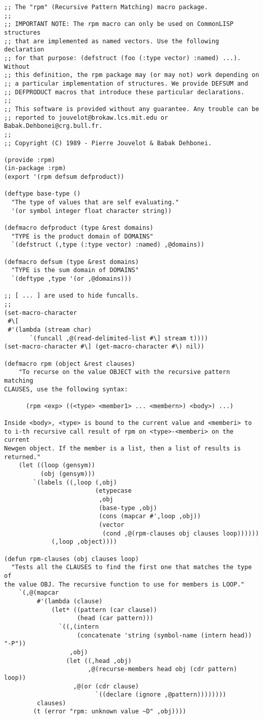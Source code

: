 \documentclass[a4paper,11pt]{article}
\begin{document}
{\small
\begin{verbatim}
;; The "rpm" (Recursive Pattern Matching) macro package.
;;
;; IMPORTANT NOTE: The rpm macro can only be used on CommonLISP structures
;; that are implemented as named vectors. Use the following declaration
;; for that purpose: (defstruct (foo (:type vector) :named) ...). Without
;; this definition, the rpm package may (or may not) work depending on
;; a particular implementation of structures. We provide DEFSUM and
;; DEFPRODUCT macros that introduce these particular declarations.
;; 
;; This software is provided without any guarantee. Any trouble can be
;; reported to jouvelot@brokaw.lcs.mit.edu or Babak.Dehbonei@crg.bull.fr.
;;
;; Copyright (C) 1989 - Pierre Jouvelot & Babak Dehbonei.

(provide :rpm)
(in-package :rpm)
(export '(rpm defsum defproduct))

(deftype base-type ()
  "The type of values that are self evaluating."
  '(or symbol integer float character string))

(defmacro defproduct (type &rest domains)
  "TYPE is the product domain of DOMAINS"
  `(defstruct (,type (:type vector) :named) ,@domains))

(defmacro defsum (type &rest domains)
  "TYPE is the sum domain of DOMAINS"
  `(deftype ,type '(or ,@domains)))

;; [ ... ] are used to hide funcalls.
;;
(set-macro-character
 #\[
 #'(lambda (stream char)
       `(funcall ,@(read-delimited-list #\] stream t))))
(set-macro-character #\] (get-macro-character #\) nil))

(defmacro rpm (object &rest clauses)
    "To recurse on the value OBJECT with the recursive pattern matching
CLAUSES, use the following syntax:

      (rpm <exp> ((<type> <member1> ... <membern>) <body>) ...)

Inside <body>, <type> is bound to the current value and <memberi> to
to i-th recursive call result of rpm on <type>-<memberi> on the current
Newgen object. If the member is a list, then a list of results is
returned."
    (let ((loop (gensym))
          (obj (gensym)))
        `(labels ((,loop (,obj)
                         (etypecase
                          ,obj
                          (base-type ,obj)
                          (cons (mapcar #',loop ,obj))
                          (vector
                           (cond ,@(rpm-clauses obj clauses loop))))))
             (,loop ,object))))

(defun rpm-clauses (obj clauses loop)
  "Tests all the CLAUSES to find the first one that matches the type of
the value OBJ. The recursive function to use for members is LOOP."
    `(,@(mapcar 
         #'(lambda (clause)
             (let* ((pattern (car clause))
                    (head (car pattern)))
               `((,(intern 
                    (concatenate 'string (symbol-name (intern head)) "-P"))
                  ,obj)
                 (let ((,head ,obj)
                       ,@(recurse-members head obj (cdr pattern) loop))
                   ,@(or (cdr clause)
                         `((declare (ignore ,@pattern))))))))
         clauses)
        (t (error "rpm: unknown value ~D" ,obj))))


\end{verbatim}}
\end{document}
